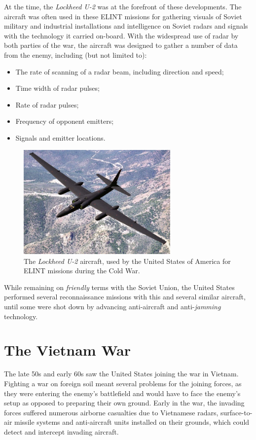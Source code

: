 \documentclass[english,purist]{ist-report}
\begin{document}
At the time, the \textit{Lockheed U-2} was at the forefront of these developments. The aircraft was often used in these ELINT missions for gathering visuals of Soviet military and industrial installations and intelligence on Soviet radars and signals with the technology it carried on-board. With the widespread use of radar by both parties of the war, the aircraft was designed to gather a number of data from the enemy, including (but not limited to):
\begin{itemize}
    \item The rate of scanning of a radar beam, including direction and speed;
    \item Time width of radar pulses;
    \item Rate of radar pulses;
    \item Frequency of opponent emitters;
    \item Signals and emitter locations.
\end{itemize}
\begin{figure}[ht]
    \centering
    \includegraphics[width = 0.7\textwidth]{lockheedu2}
    \caption{The \textit{Lockheed U-2} aircraft, used by the United States of America for ELINT missions during the Cold War.}
    \label{fig:u-2}
\end{figure}

While remaining on \textit{friendly} terms with the Soviet Union, the United States performed several reconnaissance missions with this and several similar aircraft, until some were shot down by advancing anti-aircraft and anti-\textit{jamming} technology.

\section{The Vietnam War}

The late 50s and early 60s saw the United States joining the war in Vietnam. Fighting a war on foreign soil meant several problems for the joining forces, as they were entering the enemy's battlefield and would have to face the enemy's setup as opposed to preparing their own ground. Early in the war, the invading forces suffered numerous airborne casualties due to Vietnamese radars, surface-to-air missile systems and anti-aircraft units installed on their grounds, which could detect and intercept invading aircraft.
\end{document}
